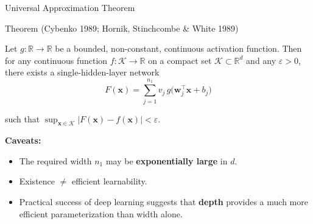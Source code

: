 \documentclass[aspectratio=169,11pt]{beamer}
\newcommand{\x}{\bm{x}}
\newcommand{\w}{\bm{w}}
\newcommand{\R}{\mathbb{R}}
\begin{document}
\begin{frame}{Universal Approximation Theorem}
\begin{block}{Theorem (Cybenko 1989; Hornik, Stinchcombe \& White 1989)}
{\small Let $g:\R\to\R$ be a bounded, non-constant, continuous activation function.  Then for any continuous function $f:\mathcal{K}\to\R$ on a compact set $\mathcal{K}\subset\R^d$ and any $\varepsilon>0$, there exists a single-hidden-layer network
\vspace{-0.2cm}
\[
    F(\x) = \sum_{j=1}^{n_1} v_j\, g\!\big(\w_j^\top\x + b_j\big)
\]
\vspace{-0.4cm}

such that $\sup_{\x\in\mathcal{K}} |F(\x) - f(\x)| < \varepsilon$.}
\end{block}

\vspace{0.1cm}
{\small\textbf{Caveats:}
\begin{itemize}\itemsep1pt
    \item The required width $n_1$ may be \textbf{exponentially large} in $d$.
    \item Existence $\neq$ efficient learnability.
    \item Practical success of deep learning suggests that \textbf{depth} provides a much more efficient parameterization than width alone.
\end{itemize}}
\end{frame}
\end{document}
